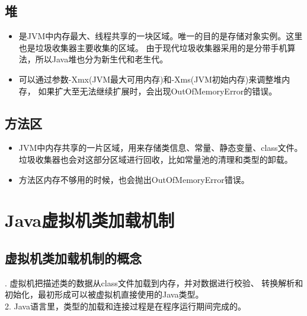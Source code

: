 \subsection{堆}
\begin{itemize}
	\item 是JVM中内存最大、线程共享的一块区域。唯一的目的是存储对象实例。这里也是垃圾收集器主要收集的区域。
	由于现代垃圾收集器采用的是分带手机算法，所以Java堆也分为新生代和老生代。
	\item 可以通过参数-Xmx(JVM最大可用内存)和-Xms(JVM初始内存)来调整堆内存，
	如果扩大至无法继续扩展时，会出现OutOfMemoryError的错误。
\end{itemize}
\subsection{方法区}
\begin{itemize}
	\item JVM中内存共享的一片区域，用来存储类信息、常量、静态变量、class文件。
	垃圾收集器也会对这部分区域进行回收，比如常量池的清理和类型的卸载。
	\item 方法区内存不够用的时候，也会抛出OutOfMemoryError错误。
\end{itemize}

\section{Java虚拟机类加载机制}
\subsection{虚拟机类加载机制的概念}
. 虚拟机把描述类的数据从class文件加载到内存，并对数据进行校验、
转换解析和初始化，最初形成可以被虚拟机直接使用的Java类型。
\\ 2. Java语言里，类型的加载和连接过程是在程序运行期间完成的。
